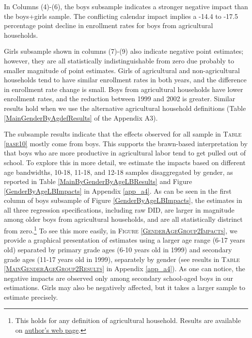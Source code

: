 \documentclass[12pt,letterpaper]{article}\usepackage[margin=1in]{geometry}
\newcommand{\0}{\ensuremath{\mbox{\boldmath $0$}}}
\begin{document}
In Columns (4)-(6), the boys subsample indicates a stronger negative impact than the boys+girls sample. The conflicting calendar impact implies a -14.4 to -17.5 percentage point decline in enrollment rates for boys from agricultural households. 

Girls subsample shown in columns (7)-(9) also indicate negative point estimates; however, they are all statistically indistinguishable from zero due probably to smaller magnitude of point estimates. Girls of agricultural and non-agricultural households tend to have similar enrollment rates in both years, and the difference in enrollment rate change is small. Boys from agricultural households have lower enrollment rates, and the reduction between 1999 and 2002 is greater. Similar results hold when we use the alternative agricultural household definitions (\textsf{\small Table \ref{MainGenderByAgdefResults}} of the Appendix A3). 

The subsample results indicate that the effects observed for all sample in \textsc{\small Table \ref{base10}} mostly come from boys. This supports the brawn-based interpretation by \cite{PittRosenzweigHassan2010} that boys who are more productive in agricultural labor tend to get pulled out of school. To explore this in more detail, we estimate the impacts based on different age bandwidths, 10-18, 11-18, and 12-18 samples disaggregated by gender, as reported in \textsf{\small Table \ref{MainByGenderByAgeLBResults}} and \textsf{\small Figure \ref{GenderByAgeLBImpacts}} in Appendix \ref{app_a4}. As can be seen in the first column of boys subsample of \textsf{\small Figure \ref{GenderByAgeLBImpacts}}, the estimates in all three regression specifications, including raw DID, are larger in magnitude among older boys from agricultural households, and are all statistically distrinct from zero.\footnote{This holds for any definition of agricultural household. Results are available on \href{https://seiroito.github.io/Ramadan/program/RamadanEstimationJDE_Tufte.html}{author's web page}. } To see this more easily, in \textsc{\small Figure \ref{GenderAgeGroup2Impacts}}, we provide a graphical presentation of estimates using a larger age range (6-17 years old) separated by primary grade ages (6-10 years old in 1999) and secondary grade ages (11-17 years old in 1999), separately by gender (see results in \textsc{\small Table \ref{MainGenderAgeGroup2Results}} in Appendix \ref{app_a4}). As one can notice, the negative impacts are observed only among secondary school-aged boys in our estimations. Girls may also be negatively affected, but it takes a larger sample to estimate precisely.
\end{document}
